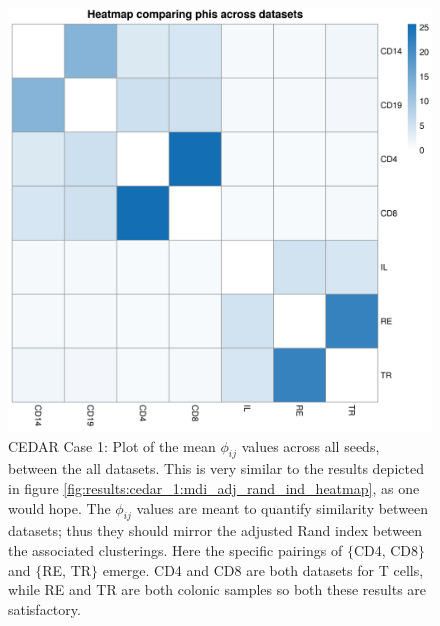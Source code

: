 \documentclass[14pt]{extarticle} %
\begin{document}
	
	\begin{figure}[h]
		\centering
		\includegraphics[scale=0.75]{Images/Biology_data/Set_250/All_datasets/Phi_heatmap_1.png}
		\caption{CEDAR Case 1: Plot of the mean $\phi_{ij}$ values across all seeds, between the all datasets. This is very similar to the results depicted in figure \ref{fig:results:cedar_1:mdi_adj_rand_ind_heatmap}, as one would hope. The $\phi_{ij}$ values are meant to quantify similarity between datasets; thus they should mirror the adjusted Rand index between the associated clusterings. Here the specific pairings of $\{$CD4, CD8$\}$ and $\{$RE, TR$\}$ emerge. CD4 and CD8 are both datasets for T cells, while RE and TR are both colonic samples so both these results are satisfactory.}
		\label{fig:results:cedar_1:mdi_phi_heatmap}
	\end{figure}
	
	\newpage
\end{document}
